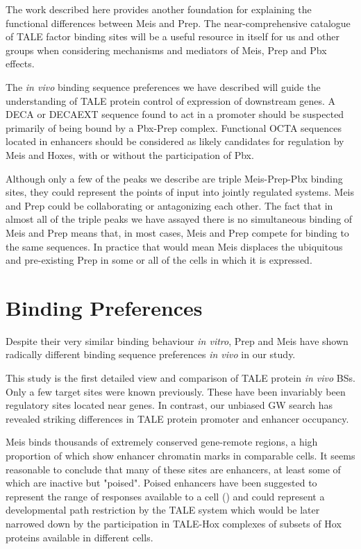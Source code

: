 The work described here provides another foundation for explaining the functional differences between Meis and Prep. The near-comprehensive catalogue of \ac{TALE} factor binding sites will be a useful resource in itself for us and other groups when considering mechanisms and mediators of Meis, Prep and Pbx effects. 

The \textit{in vivo} binding sequence preferences we have  described will guide the understanding of \ac{TALE} protein control of expression of downstream genes. A \ac{DECA} or \ac{DECAEXT} sequence found to act in a promoter should be suspected primarily of being bound by a Pbx-Prep complex. Functional \ac{OCTA} sequences located in enhancers should be considered as likely candidates for regulation by Meis and Hoxes, with or without the participation of Pbx. 


Although only a few of the peaks we describe are triple Meis-Prep-Pbx binding sites, they could represent the points of input into jointly regulated systems. Meis and Prep could be collaborating or antagonizing each other. The fact that in almost all of the triple peaks we have assayed there is no simultaneous binding of Meis and Prep means that, in most cases, Meis and Prep compete for binding to the same sequences. In practice that would mean Meis displaces the ubiquitous and pre-existing Prep in some or all of the cells in which it is expressed. 

\section{Binding Preferences}

Despite their very similar binding behaviour \textit{in vitro}, Prep and Meis have shown radically different binding sequence preferences \textit{in vivo} in our study. 

This study is the first detailed view and comparison of \ac{TALE} protein \textit{in vivo} \acp{BS}. Only a few target sites were known previously. These have been invariably been regulatory sites located near genes. In contrast, our unbiased \ac{GW} search has revealed striking differences in \ac{TALE} protein promoter and enhancer occupancy. 

Meis binds thousands of extremely conserved gene-remote regions, a high proportion of which show enhancer chromatin marks in comparable cells. It seems reasonable to conclude that many of these sites are enhancers, at least some of which are inactive but "poised". Poised enhancers have been suggested to represent the range of responses available to a cell (\cite{Creyghton2010}) and could represent a developmental path restriction by the \ac{TALE} system which would be later narrowed down by the participation in \ac{TALE}-Hox complexes of subsets of Hox proteins available in different cells. 

